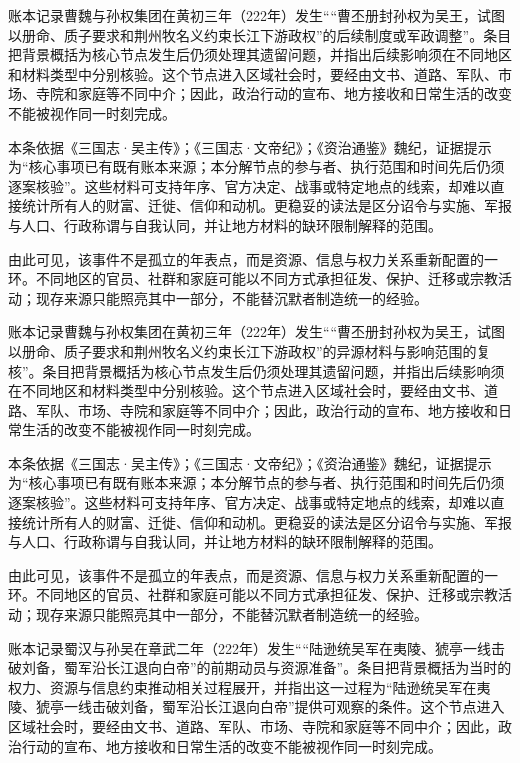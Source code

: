 账本记录曹魏与孙权集团在黄初三年（222年）发生““曹丕册封孙权为吴王，试图以册命、质子要求和荆州牧名义约束长江下游政权”的后续制度或军政调整”。条目把背景概括为核心节点发生后仍须处理其遗留问题，并指出后续影响须在不同地区和材料类型中分别核验。这个节点进入区域社会时，要经由文书、道路、军队、市场、寺院和家庭等不同中介；因此，政治行动的宣布、地方接收和日常生活的改变不能被视作同一时刻完成。

本条依据《三国志·吴主传》；《三国志·文帝纪》；《资治通鉴》魏纪，证据提示为“核心事项已有既有账本来源；本分解节点的参与者、执行范围和时间先后仍须逐案核验”。这些材料可支持年序、官方决定、战事或特定地点的线索，却难以直接统计所有人的财富、迁徙、信仰和动机。更稳妥的读法是区分诏令与实施、军报与人口、行政称谓与自我认同，并让地方材料的缺环限制解释的范围。

由此可见，该事件不是孤立的年表点，而是资源、信息与权力关系重新配置的一环。不同地区的官员、社群和家庭可能以不同方式承担征发、保护、迁移或宗教活动；现存来源只能照亮其中一部分，不能替沉默者制造统一的经验。

账本记录曹魏与孙权集团在黄初三年（222年）发生““曹丕册封孙权为吴王，试图以册命、质子要求和荆州牧名义约束长江下游政权”的异源材料与影响范围的复核”。条目把背景概括为核心节点发生后仍须处理其遗留问题，并指出后续影响须在不同地区和材料类型中分别核验。这个节点进入区域社会时，要经由文书、道路、军队、市场、寺院和家庭等不同中介；因此，政治行动的宣布、地方接收和日常生活的改变不能被视作同一时刻完成。

本条依据《三国志·吴主传》；《三国志·文帝纪》；《资治通鉴》魏纪，证据提示为“核心事项已有既有账本来源；本分解节点的参与者、执行范围和时间先后仍须逐案核验”。这些材料可支持年序、官方决定、战事或特定地点的线索，却难以直接统计所有人的财富、迁徙、信仰和动机。更稳妥的读法是区分诏令与实施、军报与人口、行政称谓与自我认同，并让地方材料的缺环限制解释的范围。

由此可见，该事件不是孤立的年表点，而是资源、信息与权力关系重新配置的一环。不同地区的官员、社群和家庭可能以不同方式承担征发、保护、迁移或宗教活动；现存来源只能照亮其中一部分，不能替沉默者制造统一的经验。

账本记录蜀汉与孙吴在章武二年（222年）发生““陆逊统吴军在夷陵、猇亭一线击破刘备，蜀军沿长江退向白帝”的前期动员与资源准备”。条目把背景概括为当时的权力、资源与信息约束推动相关过程展开，并指出这一过程为“陆逊统吴军在夷陵、猇亭一线击破刘备，蜀军沿长江退向白帝”提供可观察的条件。这个节点进入区域社会时，要经由文书、道路、军队、市场、寺院和家庭等不同中介；因此，政治行动的宣布、地方接收和日常生活的改变不能被视作同一时刻完成。


